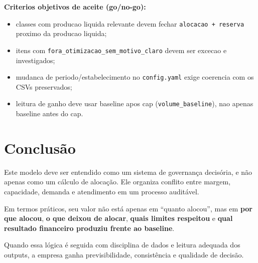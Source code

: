 \documentclass[11pt,a4paper]{article}
\begin{document}
\textbf{Criterios objetivos de aceite (go/no-go):}
\begin{itemize}[leftmargin=1.2cm]
    \item classes com producao liquida relevante devem fechar \texttt{alocacao + reserva} proximo da producao liquida;
    \item itens com \texttt{fora\_otimizacao\_sem\_motivo\_claro} devem ser excecao e investigados;
    \item mudanca de periodo/estabelecimento no \texttt{config.yaml} exige coerencia com os CSVs preservados;
    \item leitura de ganho deve usar baseline apos cap (\texttt{volume\_baseline}), nao apenas baseline antes do cap.
\end{itemize}

\section{Conclusão}

Este modelo deve ser entendido como um sistema de governança decisória, e não
apenas como um cálculo de alocação. Ele organiza conflito entre margem,
capacidade, demanda e atendimento em um processo auditável.

Em termos práticos, seu valor não está apenas em ``quanto alocou'', mas em
\textbf{por que alocou}, \textbf{o que deixou de alocar}, \textbf{quais limites
respeitou} e \textbf{qual resultado financeiro produziu frente ao baseline}.

Quando essa lógica é seguida com disciplina de dados e leitura adequada dos
outputs, a empresa ganha previsibilidade, consistência e qualidade de decisão.
\end{document}
